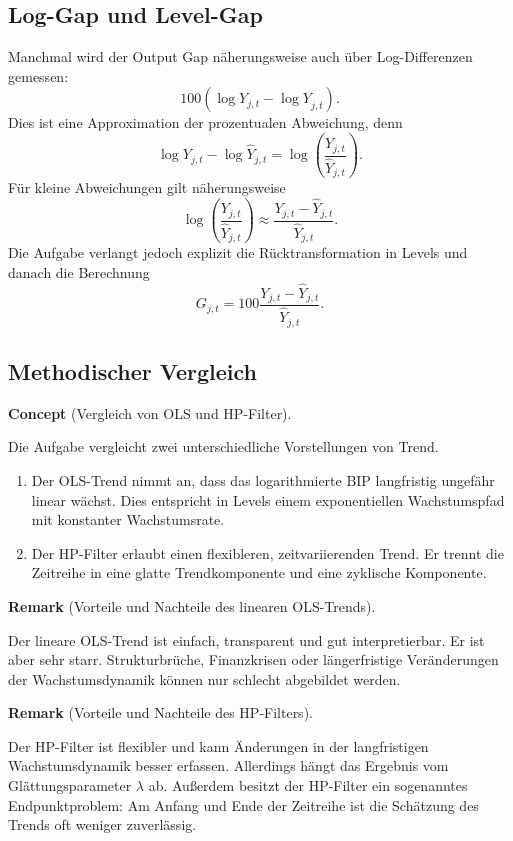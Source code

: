 \documentclass[10pt, letterpaper]{article}
\newcommand{\CustomHeading}[3]{%
  \par\medskip\noindent%
  \textbf{#1 #2} \textnormal{(#3)}.\enskip%
}
\newenvironment{REM}[2]{\CustomHeading{Remark}{#1}{#2}}{}
\newenvironment{CONC}[2]{\CustomHeading{Concept}{#1}{#2}}{}
\begin{document}
\subsection{Log-Gap und Level-Gap}

Manchmal wird der Output Gap näherungsweise auch über Log-Differenzen gemessen:
\[
100\left(\log Y_{j,t}-\widehat{\log Y}_{j,t}\right).
\]
Dies ist eine Approximation der prozentualen Abweichung, denn
\[
\log Y_{j,t}-\log \widehat{Y}_{j,t}
=
\log\left(\frac{Y_{j,t}}{\widehat{Y}_{j,t}}\right).
\]
Für kleine Abweichungen gilt näherungsweise
\[
\log\left(\frac{Y_{j,t}}{\widehat{Y}_{j,t}}\right)
\approx
\frac{Y_{j,t}-\widehat{Y}_{j,t}}{\widehat{Y}_{j,t}}.
\]
Die Aufgabe verlangt jedoch explizit die Rücktransformation in Levels und danach die Berechnung
\[
G_{j,t}
=
100
\frac{
Y_{j,t}-\widehat{Y}_{j,t}
}{
\widehat{Y}_{j,t}
}.
\]

\subsection{Methodischer Vergleich}

\begin{CONC}{}{Vergleich von OLS und HP-Filter}
Die Aufgabe vergleicht zwei unterschiedliche Vorstellungen von Trend.
\begin{enumerate}
    \item Der OLS-Trend nimmt an, dass das logarithmierte BIP langfristig ungefähr linear wächst. Dies entspricht in Levels einem exponentiellen Wachstumspfad mit konstanter Wachstumsrate.
    \item Der HP-Filter erlaubt einen flexibleren, zeitvariierenden Trend. Er trennt die Zeitreihe in eine glatte Trendkomponente und eine zyklische Komponente.
\end{enumerate}
\end{CONC}

\begin{REM}{}{Vorteile und Nachteile des linearen OLS-Trends}
Der lineare OLS-Trend ist einfach, transparent und gut interpretierbar. Er ist aber sehr starr. Strukturbrüche, Finanzkrisen oder längerfristige Veränderungen der Wachstumsdynamik können nur schlecht abgebildet werden.
\end{REM}

\begin{REM}{}{Vorteile und Nachteile des HP-Filters}
Der HP-Filter ist flexibler und kann Änderungen in der langfristigen Wachstumsdynamik besser erfassen. Allerdings hängt das Ergebnis vom Glättungsparameter \(\lambda\) ab. Außerdem besitzt der HP-Filter ein sogenanntes Endpunktproblem: Am Anfang und Ende der Zeitreihe ist die Schätzung des Trends oft weniger zuverlässig.
\end{REM}
\end{document}
